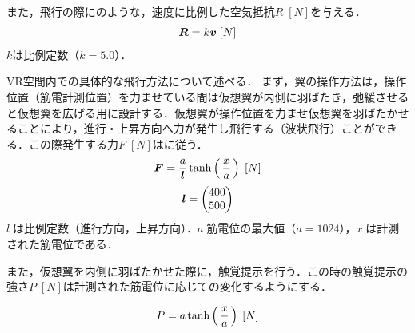         また，飛行の際にのような，速度に比例した空気抵抗$R\;[N]$を与える．
        \begin{eqnarray}
                \equlabel{air_resistance}
                \bm{R}=k\bm{v} \;[N]
        \end{eqnarray}
        $k$は比例定数（$k=5.0$）．

        VR空間内での具体的な飛行方法について述べる．
        まず，翼の操作方法は，操作位置（筋電計測位置）を力ませている間は仮想翼が内側に羽ばたき，弛緩させると仮想翼を広げる用に設計する．仮想翼が操作位置を力ませ仮想翼を羽ばたかせることにより，進行・上昇方向へ力が発生し飛行する（波状飛行\cite{bird-flying}）ことができる．この際発生する力$F\;[N]$はに従う．
        \begin{eqnarray}
                \equlabel{force}
                \bm{F}=\frac{a}{\bm{l}}  \tanh\left(\,\frac{x}{a}\,\right) \;[N]
        \end{eqnarray}
        \begin{eqnarray}
                \equlabel{force_prop}
                \bm{l}=\begin{pmatrix}400 \\ 500 \end{pmatrix}
        \end{eqnarray}
        $l\;$は比例定数（進行方向，上昇方向）．$a\;$筋電位の最大値（$a=1024$），$x\;$は計測された筋電位である．

        また，仮想翼を内側に羽ばたかせた際に，触覚提示を行う．この時の触覚提示の強さ$P\;[N]$は計測された筋電位に応じての変化するようにする．
        
        \begin{eqnarray}
                \equlabel{haptics}
                P=a \tanh\left(\,\frac{x}{a}\,\right) \;[N]
        \end{eqnarray}
        
